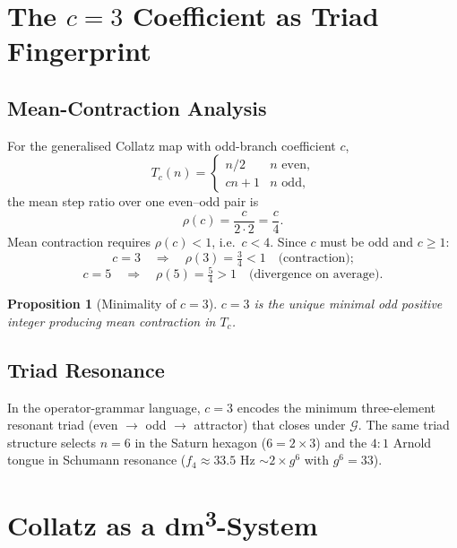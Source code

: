 \documentclass[11pt,a4paper]{article}
\newtheorem{proposition}[theorem]{Proposition}
\begin{document}
\section{The \texorpdfstring{$c = 3$}{c=3} Coefficient as Triad Fingerprint}

\subsection{Mean-Contraction Analysis}

For the generalised Collatz map with odd-branch coefficient $c$,
\[
  T_c(n) = \begin{cases} n/2 & n \text{ even,} \\ cn+1 & n \text{ odd,} \end{cases}
\]
the mean step ratio over one even--odd pair is
\[
  \rho(c) = \frac{c}{2 \cdot 2} = \frac{c}{4}.
\]
Mean contraction requires $\rho(c) < 1$, i.e.\ $c < 4$.
Since $c$ must be odd and $c \geq 1$:
\[
  c = 3 \quad \Longrightarrow \quad \rho(3) = \tfrac{3}{4} < 1 \quad
  \text{(contraction);}
\]
\[
  c = 5 \quad \Longrightarrow \quad \rho(5) = \tfrac{5}{4} > 1 \quad
  \text{(divergence on average).}
\]

\begin{proposition}[Minimality of $c = 3$]
$c = 3$ is the unique minimal odd positive integer producing mean
contraction in $T_c$.
\end{proposition}

\subsection{Triad Resonance}

In the operator-grammar language, $c = 3$ encodes the minimum
three-element resonant triad (even $\to$ odd $\to$ attractor) that
closes under $\mathcal{G}$.  The same triad structure selects $n = 6$
in the Saturn hexagon ($6 = 2 \times 3$) and the $4:1$ Arnold tongue
in Schumann resonance ($f_4 \approx 33.5$ Hz $\sim 2 \times g^6$
with $g^6 = 33$).

\section{Collatz as a dm\textsuperscript{3}-System}
\end{document}
